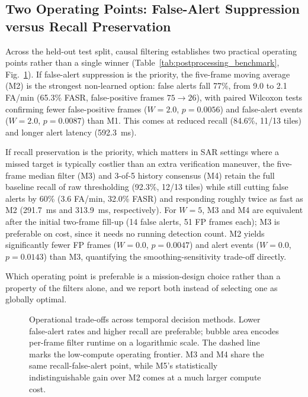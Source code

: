 \documentclass[conference]{IEEEtran}
\begin{document}
\subsection{Two Operating Points: False-Alert Suppression versus Recall Preservation}
Across the held-out test split, causal filtering establishes two practical operating points rather than a single winner (Table~\ref{tab:postprocessing_benchmark}, Fig.~\ref{fig:performance_tradeoff}). If false-alert suppression is the priority, the five-frame moving average (M2) is the strongest non-learned option: false alerts fall 77\%, from 9.0 to 2.1 FA/min (65.3\% FASR, false-positive frames $75\to26$), with paired Wilcoxon tests confirming fewer false-positive frames ($W=2.0$, $p=0.0056$) and false-alert events ($W=2.0$, $p=0.0087$) than M1. This comes at reduced recall (84.6\%, 11/13 tiles) and longer alert latency (592.3~ms).

If recall preservation is the priority, which matters in SAR settings where a missed target is typically costlier than an extra verification maneuver, the five-frame median filter (M3) and 3-of-5 history consensus (M4) retain the full baseline recall of raw thresholding (92.3\%, 12/13 tiles) while still cutting false alerts by 60\% (3.6 FA/min, 32.0\% FASR) and responding roughly twice as fast as M2 (291.7~ms and 313.9~ms, respectively). For $W=5$, M3 and M4 are equivalent after the initial two-frame fill-up (14 false alerts, 51 FP frames each); M3 is preferable on cost, since it needs no running detection count. M2 yields significantly fewer FP frames ($W=0.0$, $p=0.0047$) and alert events ($W=0.0$, $p=0.0143$) than M3, quantifying the smoothing-sensitivity trade-off directly.

Which operating point is preferable is a mission-design choice rather than a property of the filters alone, and we report both instead of selecting one as globally optimal.

\begin{figure}[!t]
\centering
\resizebox{0.98\columnwidth}{!}{}
\caption{Operational trade-offs across temporal decision methods. Lower false-alert rates and higher recall are preferable; bubble area encodes per-frame filter runtime on a logarithmic scale. The dashed line marks the low-compute operating frontier. M3 and M4 share the same recall-false-alert point, while M5's statistically indistinguishable gain over M2 comes at a much larger compute cost.}
\label{fig:performance_tradeoff}
\end{figure}
\end{document}
